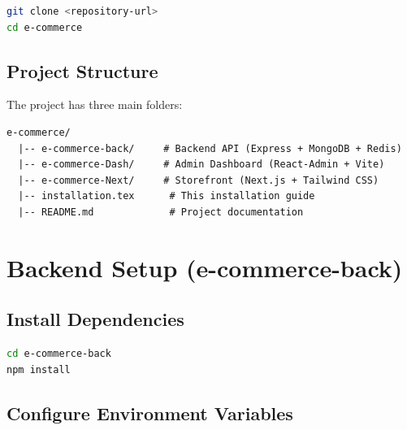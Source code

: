 \documentclass[12pt,a4paper]{article}
\begin{document}
\begin{lstlisting}[language=bash, caption=Clone the project]
git clone <repository-url>
cd e-commerce
\end{lstlisting}

\subsection{Project Structure}

The project has three main folders:

\begin{lstlisting}[caption=Project folder structure]
e-commerce/
  |-- e-commerce-back/     # Backend API (Express + MongoDB + Redis)
  |-- e-commerce-Dash/     # Admin Dashboard (React-Admin + Vite)
  |-- e-commerce-Next/     # Storefront (Next.js + Tailwind CSS)
  |-- installation.tex      # This installation guide
  |-- README.md             # Project documentation
\end{lstlisting}

\newpage

\section{Backend Setup (e-commerce-back)}

\subsection{Install Dependencies}

\begin{lstlisting}[language=bash, caption=Install backend packages]
cd e-commerce-back
npm install
\end{lstlisting}

\subsection{Configure Environment Variables}
\end{document}
